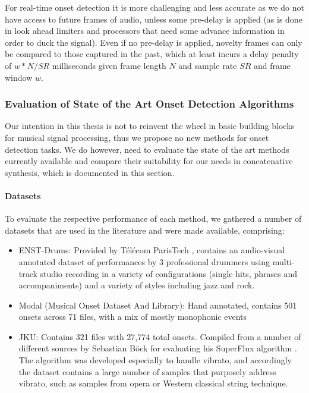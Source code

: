 For real-time onset detection it is more challenging and less accurate as we do not have access to future frames of audio, unless some pre-delay is applied (as is done in look ahead limiters and processors that need some advance information in order to duck the signal). Even if no pre-delay is applied, novelty frames can only be compared to those captured in the past, which at least incurs a delay penalty of $w*N/SR$ milliseconds given frame length $N$ and sample rate $SR$ and frame window $w$.

\subsubsection{Evaluation of State of the Art Onset Detection Algorithms}

Our intention in this thesis is not to reinvent the wheel in basic building blocks for  musical signal processing, thus we propose no new methods for onset detection tasks. We do however, need to evaluate the state of the art methods currently available and compare their suitability for our needs in concatenative synthesis, which is documented in this section.

\paragraph{Datasets}

To evaluate the respective performance of each method, we gathered a number of datasets that are used in the literature and were made available, comprising:

\begin{itemize}
  \item ENST-Drums: Provided by Télécom ParisTech \citep{Gillet2006}, contains an audio-visual annotated dataset of performances by 3 professional drummers using multi-track studio recording in a variety of configurations (single hits, phrases and accompaniments) and a variety of styles including jazz and rock. 
  \item Modal (Musical Onset Dataset And Library): Hand annotated, contains 501 onsets across 71 files, with a mix of mostly monophonic events \citep{Glover2011}
  \item JKU: Contains 321 files with 27,774 total onsets. Compiled from a number of different sources by Sebastian Böck for evaluating his SuperFlux algorithm \citep{Bock2013}. The algorithm was developed especially to handle vibrato, and accordingly the dataset contains a large number of samples that purposely address vibrato, such as samples from opera or Western classical string technique.
\end{itemize}

